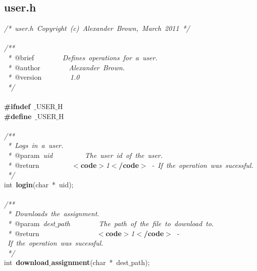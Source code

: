 \clearpage
\normalsize
\rmfamily
\subsection{user.h}
\scriptsize
\sffamily
\noindent
\mbox{}\textit{/*\ user.h\ Copyright\ (c)\ Alexander\ Brown,\ March\ 2011\ */} \\
\mbox{} \\
\mbox{}\textit{/**} \\
\mbox{}\textit{\ *\ }@brief\textit{\ \ \ \ \ \ \ \ Defines\ operations\ for\ a\ user.} \\
\mbox{}\textit{\ *\ }@author\textit{\ \ \ \ \ \ \ \ Alexander\ Brown.} \\
\mbox{}\textit{\ *\ }@version\textit{\ \ \ \ \ \ \ \ 1.0} \\
\mbox{}\textit{\ */} \\
\mbox{} \\
\mbox{}\textbf{\#ifndef}\ $\_$USER$\_$H \\
\mbox{}\textbf{\#define}\ $\_$USER$\_$H \\
\mbox{} \\
\mbox{}\textit{/**} \\
\mbox{}\textit{\ *\ Logs\ in\ a\ user.} \\
\mbox{}\textit{\ *\ }@param\textit{\ uid\ \ \ \ \ \ \ \ \ The\ user\ id\ of\ the\ user.} \\
\mbox{}\textit{\ *\ }@return\textit{\ \ \ \ \ \ \ \ \ }\textbf{$<$code$>$}\textit{1}\textbf{$<$/code$>$}\textit{\ -\ If\ the\ operation\ was\ sucessful.} \\
\mbox{}\textit{\ */} \\
\mbox{}int\ \textbf{login}(char\ *\ uid); \\
\mbox{} \\
\mbox{}\textit{/**} \\
\mbox{}\textit{\ *\ Downloads\ the\ assignment.} \\
\mbox{}\textit{\ *\ }@param\textit{\ dest$\_$path\ \ \ \ \ \ \ \ The\ path\ of\ the\ file\ to\ download\ to.} \\
\mbox{}\textit{\ *\ }@return\textit{\ \ \ \ \ \ \ \ \ \ \ \ \ \ \ \ }\textbf{$<$code$>$}\textit{1}\textbf{$<$/code$>$}\textit{\ -\ If\ the\ operation\ was\ sucessful.} \\
\mbox{}\textit{\ */} \\
\mbox{}int\ \textbf{download$\_$assignment}(char\ *\ dest$\_$path); \\
